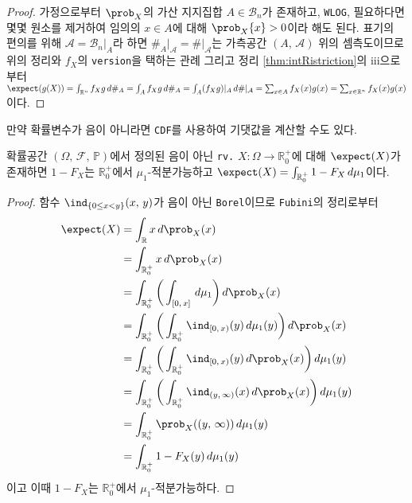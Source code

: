 \begin{proof}
    가정으로부터 $\prob_X$의 가산 지지집합 $A\in\mathcal{B}_n$가 존재하고, \texttt{WLOG}, 필요하다면 몇몇 원소를 제거하여 임의의 $x\in A$에 대해 $\prob_X\{x\}>0$이라 해도 된다. 표기의 편의를 위해 $\mathcal{A}=\mathcal{B}_n\vert_A$라 하면 $\#_A\vert_\mathcal{A}=\#\vert_\mathcal{A}$는 가측공간 $(A,\,\mathcal{A})$ 위의 셈측도이므로 위의 정리와 $f_X$의 \texttt{version}을 택하는 관례 그리고 정리 \ref{thm:intRistriction}의 iii으로부터 $\expect(g(X))=\int_{\mathbb{R}^n}f_Xg\,d\#_A=\int_Af_Xg\,d\#_A=\int_A(f_Xg)\vert_A\,d\#\vert_\mathcal{A}=\sum_{x\in A}f_X(x)g(x)=\sum_{x\in\mathbb{R}^n}f_X(x)g(x)$이다.
\end{proof}

만약 확률변수가 음이 아니라면 \texttt{CDF}를 사용하여 기댓값을 계산할 수도 있다.

\begin{theorem}
    확률공간 $(\Omega,\,\mathcal{F},\,\mathbb{P})$에서 정의된 음이 아닌 \texttt{rv.} $X:\Omega\to\mathbb{R}_0^+$에 대해 $\expect(X)$가 존재하면 $1-F_X$는 $\mathbb{R}_0^+$에서 $\mu_1$-적분가능하고 $\expect(X)=\int_{\mathbb{R}_0^+}1-F_X\,d\mu_1$이다.
\end{theorem}

\begin{proof}
    함수 $\ind_{\{0\leq x<y\}}(x,\,y)$가 음이 아닌 \texttt{Borel}이므로 \texttt{Fubini}의 정리로부터
    \begin{align*}
        \expect(X)&=\int_\mathbb{R}x\,d\prob_X(x)\\
        &=\int_{\mathbb{R}_0^+}x\,d\prob_X(x)\\
        &=\int_{\mathbb{R}_0^+}\bigg(\int_{[0,\,x]}\,d\mu_1\bigg)\,d\prob_X(x)\\
        &=\int_{\mathbb{R}_0^+}\bigg(\int_{\mathbb{R}_0^+}\ind_{[0,\,x)}(y)\,d\mu_1(y)\bigg)\,d\prob_X(x)\\
        &=\int_{\mathbb{R}_0^+}\bigg(\int_{\mathbb{R}_0^+}\ind_{[0,\,x)}(y)\,d\prob_X(x)\bigg)\,d\mu_1(y)\\
        &=\int_{\mathbb{R}_0^+}\bigg(\int_{\mathbb{R}_0^+}\ind_{(y,\,\infty)}(x)\,d\prob_X(x)\bigg)\,d\mu_1(y)\\
        &=\int_{\mathbb{R}_0^+}\prob_X((y,\,\infty))\,d\mu_1(y)\\
        &=\int_{\mathbb{R}_0^+}1-F_X(y)\,d\mu_1(y)
    \end{align*}
    이고 이때 $1-F_X$는 $\mathbb{R}_0^+$에서 $\mu_1$-적분가능하다.
\end{proof}


